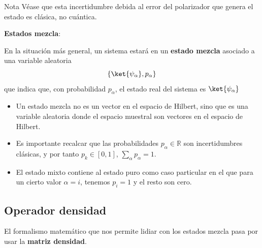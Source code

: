 \documentclass[a4paper,11pt]{book} %
\numberwithin{equation}{chapter}
\def\lc{\left[}
\def\rc{\right]}
\begin{document}
\begin{mybox_blue}{Nota}
Véase que esta incertidumbre debida al error del polarizador que genera el estado es clásica, no cuántica.
\end{mybox_blue}

\begin{mybox_gray2}{}
\textbf{Estados mezcla}:

En la situación más general, un  sistema estará en un \textbf{estado mezcla} asociado a una variable aleatoria
	\begin{equation}
	\{\ket{\psi_\alpha},p_\alpha\}
	\end{equation}
que indica que, con probabilidad $p_\alpha$,  el estado real del sistema es $\ket{\psi_\alpha}$
\end{mybox_gray2}

\begin{itemize}
	\item Un estado mezcla no es un vector en el espacio de Hilbert, sino que es una variable aleatoria donde el espacio muestral son vectores en el espacio de Hilbert.

	\item Es importante recalcar que las probabilidades $p_\alpha \in  \mathbb{R}$ son incertidumbres clásicas, y por tanto $p_k \in \lc 0,1 \rc$, $\sum_\alpha p_\alpha = 1$.

	\item El estado mixto contiene al estado puro como caso particular en el que para un cierto valor $\alpha = i$, tenemos $p_i = 1$ y el resto son cero. 
\end{itemize}


		\subsection{Operador densidad}

El formalismo matemático que nos permite lidiar con los estados mezcla pasa por usar la \textbf{matriz densidad}.
\end{document}
